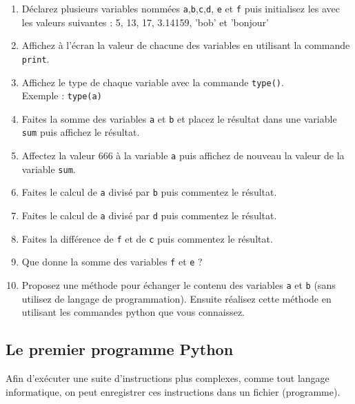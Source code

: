 \begin{enumerate}

\item Déclarez plusieurs variables nommées \texttt{a},\texttt{b},\texttt{c},\texttt{d}, \texttt{e} et \texttt{f}
            puis initialisez les avec les valeurs suivantes : 5, 13, 17, 3.14159, 'bob' et 'bonjour'

\item Affichez à l'écran la valeur de chacune des variables en utilisant la commande \texttt{print}.

\item Affichez le type de chaque variable avec la commande \texttt{type()}.\\
  Exemple : \texttt{type(a)}

\item Faites la somme des variables \texttt{a} et \texttt{b} et placez le
  résultat dans une variable \texttt{sum} puis affichez le résultat.

\item Affectez la valeur 666 à la variable \texttt{a} puis affichez de nouveau la valeur de la variable \texttt{sum}.

\item Faites le calcul de \texttt{a} divisé par \texttt{b} puis commentez le résultat.

\item Faites le calcul de \texttt{a} divisé par \texttt{d} puis commentez le résultat.

\item Faites la différence de \texttt{f} et de \texttt{c} puis commentez le résultat.

\item Que donne la somme des variables \texttt{f} et \texttt{e} ?

\item Proposez une méthode pour échanger le contenu des variables \texttt{a} et \texttt{b} (sans utilisez de langage de programmation).
  Ensuite réalisez cette méthode en utilisant les commandes python que vous connaissez.

\end{enumerate}


\subsection{Le premier programme Python}

Afin d'exécuter une suite d'instructions plus complexes,
comme tout langage informatique, on peut enregistrer ces
instructions dans un fichier (programme).

